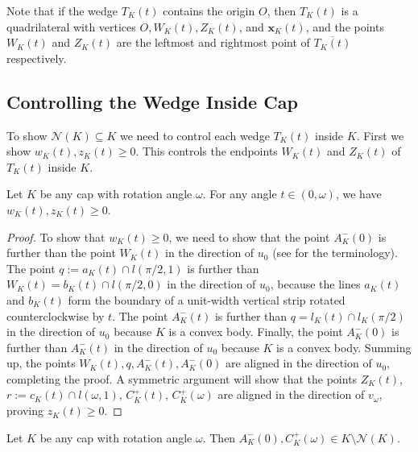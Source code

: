 Note that if the wedge \(T_K(t)\) contains the origin \(O\), then \(T_K(t)\) is a quadrilateral with vertices \(O, W_K(t), Z_K(t)\), and \(\mathbf{x}_K(t)\), and the points \(W_K(t)\) and \(Z_K(t)\) are the leftmost and rightmost point of \(\overline{T_K(t)}\) respectively.

\subsection{Controlling the Wedge Inside Cap}

To show \(\mathcal{N}(K) \subseteq K\) we need to control each wedge \(T_K(t)\) inside \(K\). First we show \(w_K(t), z_K(t) \geq 0\). This controls the endpoints \(W_K(t)\) and \(Z_K(t)\) of \(T_K(t)\) inside \(K\).

\begin{lemma}

Let \(K\) be any cap with rotation angle \(\omega\). For any angle \(t \in (0, \omega)\), we have \(w_K(t), z_K(t) \geq 0\).

\label{lem:wedge-ends-in-cap}
\end{lemma}

\begin{proof}
To show that \(w_K(t) \geq 0\), we need to show that the point \(A_K^-(0)\) is further than the point \(W_K(t)\) in the direction of \(u_0\) (see  for the terminology). The point \(q := a_K(t) \cap l(\pi/2, 1)\) is further than \(W_K(t) = b_K(t) \cap l(\pi/2, 0)\) in the direction of \(u_0\), because the lines \(a_K(t)\) and \(b_K(t)\) form the boundary of a unit-width vertical strip rotated counterclockwise by \(t\). The point \(A^-_K(t)\) is further than \(q = l_K(t) \cap l_K(\pi/2)\) in the direction of \(u_0\) because \(K\) is a convex body. Finally, the point \(A^-_K(0)\) is further than \(A_K^-(t)\) in the direction of \(u_0\) because \(K\) is a convex body. Summing up, the points \(W_K(t), q, A_K^-(t), A_K^-(0)\) are aligned in the direction of \(u_0\), completing the proof. A symmetric argument will show that the points \(Z_K(t)\), \(r := c_K(t) \cap l(\omega, 1)\), \(C_K^+(t)\), \(C_K^+(\omega)\) are aligned in the direction of \(v_\omega\), proving \(z_K(t) \geq 0\).
\end{proof}

\begin{corollary}

Let \(K\) be any cap with rotation angle \(\omega\). Then \(A^-_K(0), C^+_K(\omega) \in K \setminus \mathcal{N}(K)\).

\label{cor:cap-ends-not-in-niche}
\end{corollary}

